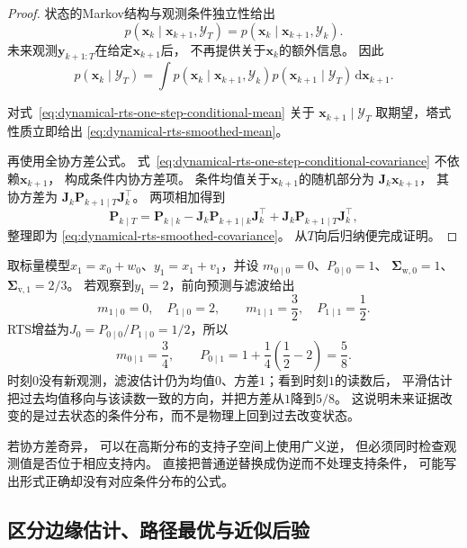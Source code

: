 \begin{proof}
	状态的Markov结构与观测条件独立性给出
	\[
		p(\bm{x}_{k}\mid\bm{x}_{k+1},\mathcal{Y}_{T}) = p(\bm{x}_{k}\mid\bm{x}_{k+1},
		\mathcal{Y}_{k}).
	\]
	未来观测$\bm{y}_{k+1:T}$在给定$\bm{x}_{k+1}$后， 不再提供关于$\bm{x}_{k}$的额外信息。
	因此
	\begin{equation}
		p(\bm{x}_{k}\mid\mathcal{Y}_{T}) = \int p(\bm{x}_{k}\mid\bm{x}_{k+1},\mathcal{Y}
		_{k}) p(\bm{x}_{k+1}\mid\mathcal{Y}_{T}) \,\mathrm{d}\bm{x}_{k+1}. \label{eq:dynamical-rts-backward-factorization}
	\end{equation}

	对式~\eqref{eq:dynamical-rts-one-step-conditional-mean} 关于 $\bm{x}_{k+1}\mid\mathcal{Y}
	_{T}$ 取期望，塔式性质立即给出 \eqref{eq:dynamical-rts-smoothed-mean}。

	再使用全协方差公式。 式~\eqref{eq:dynamical-rts-one-step-conditional-covariance}
	不依赖$\bm{x}_{k+1}$， 构成条件内协方差项。 条件均值关于$\bm{x}_{k+1}$的随机部分为
	$\bm{J}_{k}\bm{x}_{k+1}$， 其协方差为
	$\bm{J}_{k}\bm{P}_{k+1\mid T}\bm{J}_{k}^{\top}$。 两项相加得到
	\[
		\bm{P}_{k\mid T}= \bm{P}_{k\mid k}- \bm{J}_{k}\bm{P}_{k+1\mid k}\bm{J}_{k}^{\top}
		+ \bm{J}_{k}\bm{P}_{k+1\mid T}\bm{J}_{k}^{\top},
	\]
	整理即为 \eqref{eq:dynamical-rts-smoothed-covariance}。 从$T$向后归纳便完成证明。
\end{proof}

\begin{example}[未来观测降低过去状态的不确定性]
	\label{ex:dynamical-scalar-rts-update}
	取标量模型$x_1=x_0+w_0$、$y_1=x_1+v_1$，并设
	$m_{0\mid0}=0$、$P_{0\mid0}=1$、
	$\bm{\Sigma}_{\mathrm{w},0}=1$、$\bm{\Sigma}_{\mathrm{v},1}=2/3$。
	若观察到$y_1=2$，前向预测与滤波给出
	\[
		m_{1\mid0}=0,\quad P_{1\mid0}=2,\qquad
		m_{1\mid1}=\frac32,\quad P_{1\mid1}=\frac12.
	\]
	RTS增益为$J_0=P_{0\mid0}/P_{1\mid0}=1/2$，所以
	\[
		m_{0\mid1}=\frac34,\qquad
		P_{0\mid1}=1+\frac14\left(\frac12-2\right)=\frac58.
	\]
	时刻$0$没有新观测，滤波估计仍为均值$0$、方差$1$；看到时刻$1$的读数后，
	平滑估计把过去均值移向与该读数一致的方向，并把方差从$1$降到$5/8$。
	这说明未来证据改变的是过去状态的条件分布，而不是物理上回到过去改变状态。
\end{example}

若协方差奇异， 可以在高斯分布的支持子空间上使用广义逆， 但必须同时检查观测值是否位于相应支持内。
直接把普通逆替换成伪逆而不处理支持条件， 可能写出形式正确却没有对应条件分布的公式。

\subsection{区分边缘估计、路径最优与近似后验}

